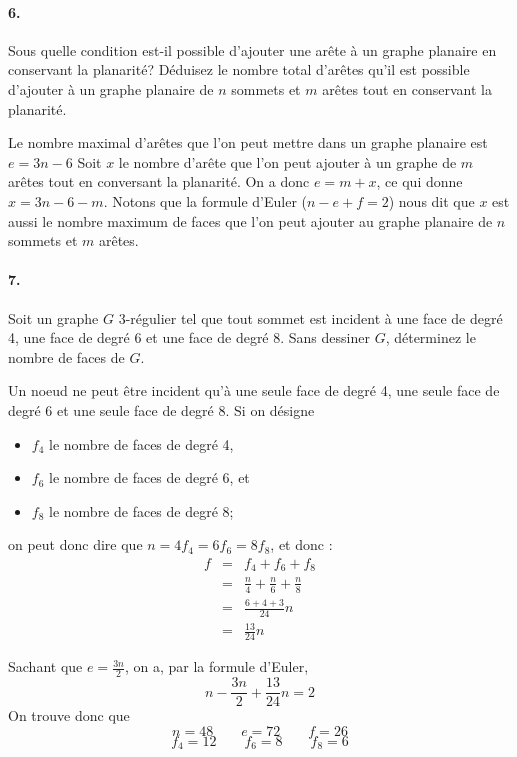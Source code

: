 \paragraph{6. } Sous quelle condition est-il possible d’ajouter une arête à un graphe planaire en conservant la planarité? Déduisez le nombre total d’arêtes qu’il est possible d’ajouter à un graphe planaire de $n$ sommets et $m$ arêtes tout en conservant la planarité.

\begin{solution} Le nombre maximal d'arêtes que l'on peut mettre dans un graphe planaire est $e = 3n - 6$ Soit $x$ le nombre d'arête que l'on peut ajouter à un graphe de $m$ arêtes tout en conversant la planarité. On a donc $e = m + x$, ce qui donne $x = 3n - 6 - m$. Notons que la formule d'Euler ($ n - e + f = 2$) nous dit que $x$ est aussi le nombre maximum de faces que l'on peut ajouter au graphe planaire de $n$ sommets et $m$ arêtes. 
\end{solution}

\paragraph{7. } Soit un graphe $G$ 3-régulier tel que tout sommet est incident à une face de degré 4, une face de degré 6 et une face de degré 8. Sans dessiner $G$, déterminez le nombre de faces de $G$.

\begin{solution} Un noeud ne peut être incident qu'à une seule face de degré 4, une seule face de degré 6 et une seule face de degré 8. Si on désigne
\begin{itemize}
\item $f_4$ le nombre de faces de degré 4,
\item $f_6$ le nombre de faces de degré 6, et
\item $f_8$ le nombre de faces de degré 8;
\end{itemize}
on peut donc dire que $n = 4f_4 = 6f_6 = 8f_8$, et donc : 
\[  
\begin{array}{rcl}
f &=& f_4 + f_6 + f_8 \\
  &=& \frac{n}{4} + \frac{n}{6} + \frac{n}{8} \\
  &=& \frac{6 + 4 + 3}{24} n \\
  &=& \frac{13}{24} n 
\end{array}
\]

Sachant que $e = \frac{3n}{2}$, on a, par la formule d'Euler, $$ n - \frac{3n}{2} + \frac{13}{24} n = 2 $$
On trouve donc que $$ n = 48 \qquad e = 72 \qquad f = 26$$
$$ f_4 = 12 \qquad f_6 = 8 \qquad f_8 = 6$$
\end{solution}
